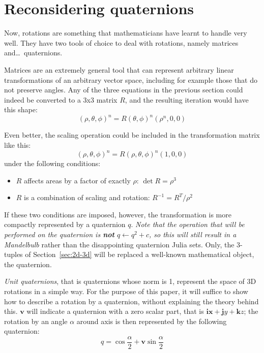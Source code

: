 \documentclass{article}
\let\vec\mathbf
\begin{document}
\section{Reconsidering quaternions}

Now, rotations are something that mathematicians have learnt to handle
very well.  They have two tools of choice to deal with rotations, namely
matrices and\dots\ quaternions.

Matrices are an extremely general tool that can represent arbitrary
linear transformations of an arbitrary vector space, including for
example those that do not preserve angles.  Any of the three equations
in the previous section could indeed be converted to a 3x3 matrix $R$,
and the resulting iteration would have this shape:
\begin{equation*}
  (\rho,\theta,\phi)^n = R(\theta,\phi)^n (\rho^n,0,0)
\end{equation*}

\noindent
Even better, the scaling operation could be included in the transformation
matrix like this:
\begin{equation*}
  (\rho,\theta,\phi)^n = R(\rho,\theta,\phi)^n (1,0,0)
\end{equation*}
\noindent
under the following conditions:
\begin{itemize}
\item $R$ affects areas by a factor of exactly $\rho$: $\det R = \rho^3$
\item $R$ is a combination of scaling and rotation: $R^{-1} = R^T / \rho^2$
\end{itemize}

If these two conditions are imposed, however, the transformation is
more compactly represented by a quaternion $q$.  \emph{Note that the
  operation that will be performed on the quaternion is \textbf{not}
  $q\leftarrow q^2+c$, so this will still result in a Mandelbulb}
rather than the disappointing quaternion Julia sets.  Only, the
3-tuples of Section~\ref{sec:2d-3d} will be replaced a well-known
mathematical object, the quaternion.

\emph{Unit quaternions}, that is quaternions whose norm is 1, represent
the space of 3D rotations in a simple way.  For the purpose of this paper,
it will suffice to show how to describe a rotation by a quaternion,
without explaining the theory behind this.  $\vec{v}$ will indicate a
quaternion with a zero scalar part, that is $\vec{ix}+\vec{j}y+\vec{k}z$;
the rotation by an angle $\alpha$ around axis is then represented by the
following quaternion:
\begin{equation*}
q = \cos \frac\alpha2 + \vec{v} \sin \frac\alpha2
\end{equation*}
\end{document}
